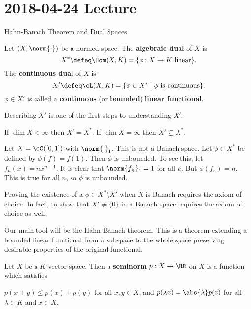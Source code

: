 \section{2018-04-24 Lecture}

Hahn-Banach Theorem and Dual Spaces

\begin{defn}
  Let $(X,\norm{\cdot})$ be a normed space.
  The \textbf{algebraic dual} of $X$ is
  \[X^* \defeq \Hom(X,K) = \{\phi:X \to K \text{ linear}\}.\]
  The \textbf{continuous dual} of $X$ is
  \[X' \defeq \cL(X,K) = \{\phi \in X^* \mid \phi \text{ is continuous}\}.\]
  $\phi \in X'$ is called a \textbf{continuous} (or \textbf{bounded}) \textbf{linear functional}.
\end{defn}

Describing $X'$ is one of the first steps to understanding $X'$.

\begin{rmk}
  \lv
  \begin{itm}
    \io If $\dim X<\infty$ then $X'=X^*$.
    \io If $\dim X=\infty$ then $X' \subsetneq X^*$.
  \end{itm}
\end{rmk}

\begin{exam}
  Let $X=\cC([0,1])$ with $\norm{\cdot}_1$.
  This is not a Banach space.
  Let $\phi \in X^*$ be defined by $\phi(f)=f(1)$.
  Then $\phi$ is unbounded.
  To see this, let $f_n(x) = nx^{n-1}$.
  It is clear that $\norm{f_n}_1=1$ for all $n$.
  But $\phi(f_n)=n$.
  This is true for all $n$, so $\phi$ is unbounded.
\end{exam}

\begin{rmk}
  Proving the existence of a $\phi \in X^* \setminus X'$ when $X$ is Banach requires the axiom of choice.
  In fact, to show that $X' \neq \{0\}$ in a Banach space requires the axiom of choice as well.
\end{rmk}

Our main tool will be the Hahn-Banach theorem.
This is a theorem extending a bounded linear functional from a subspace to the whole space preserving desirable properties of the original functional.

\begin{defn}
  Let $X$ be a $K$-vector space.
  Then a \textbf{seminorm} $p: X \to \RR$ on $X$ is a function which satisfies
  \begin{enum}
    \io $p(x+y) \leq p(x)+p(y)$ for all $x,y \in X$, and
    \io $p(\lambda x) = \abs{\lambda}p(x)$ for all $\lambda \in K$ and $x \in X$.
  \end{enum}
\end{defn}

